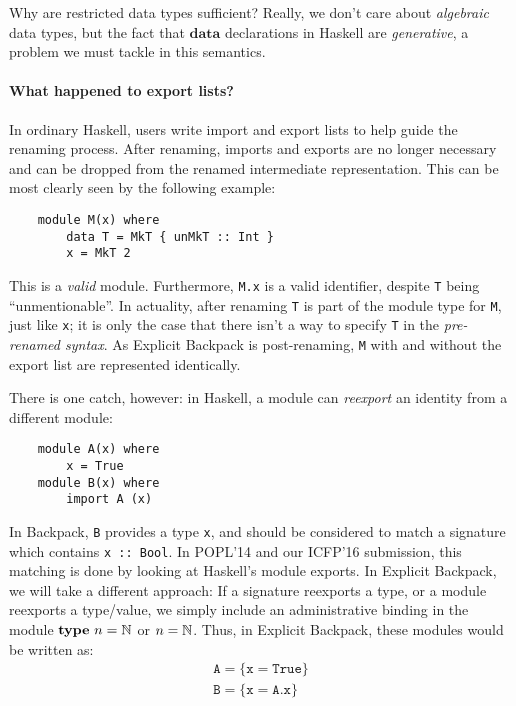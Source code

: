 \documentclass{article}
\begin{document}
Why are restricted data types sufficient?  Really, we don't
care about \emph{algebraic} data types, but the fact that
$\mathbf{data}$ declarations in Haskell are \emph{generative},
a problem we must tackle in this semantics.

\paragraph{What happened to export lists?}
In ordinary Haskell, users write import and export lists to help
guide the renaming process.  After renaming, imports and exports
are no longer necessary and can be dropped from the renamed intermediate
representation.  This can be most clearly seen by the following example:

\begin{verbatim}
    module M(x) where
        data T = MkT { unMkT :: Int }
        x = MkT 2
\end{verbatim}
%
This is a \emph{valid} module.  Furthermore, \verb|M.x| is a valid
identifier, despite \verb|T| being ``unmentionable''.  In actuality,
after renaming \verb|T| is part of the module type for \verb|M|, just
like \verb|x|; it is only the case that there isn't a way to specify
\verb|T| in the \emph{pre-renamed syntax}. As Explicit Backpack is
post-renaming, \verb|M| with and without the export list are represented
identically.

There is one catch, however: in Haskell, a module can \emph{reexport}
an identity from a different module:

\begin{verbatim}
    module A(x) where
        x = True
    module B(x) where
        import A (x)
\end{verbatim}

In Backpack, \verb|B| provides a type \verb|x|, and should be considered
to match a signature which contains \verb|x :: Bool|.  In POPL'14 and
our ICFP'16 submission, this matching is done by looking at Haskell's
module exports.  In Explicit Backpack, we will take a different
approach: If a signature reexports a type, or a module reexports a
type/value, we simply include an administrative binding in the module
$\mathbf{type}~n = \mathbb{N}$ or $n = \mathbb{N}$.  Thus, in Explicit Backpack,
these modules would be written as:
\[
\begin{array}{l}
\mathtt{A} = \{ \mathtt{x} = \mathtt{True} \} \\
\mathtt{B} = \{ \mathtt{x} = \mathtt{A}.\mathtt{x} \}
\end{array}
\]
\end{document}
